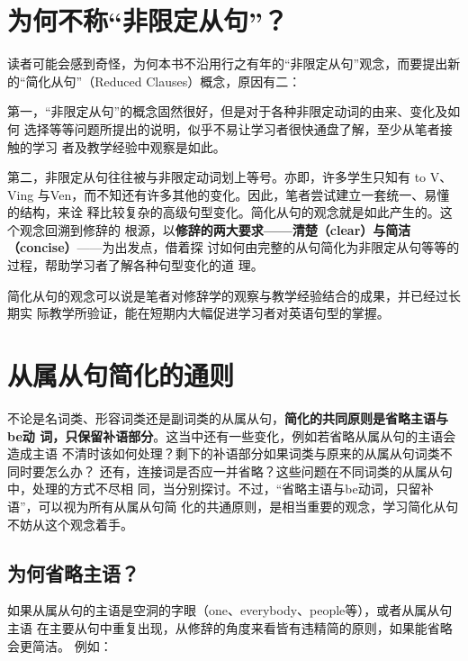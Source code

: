 \section{为何不称“非限定从句”？}

读者可能会感到奇怪，为何本书不沿用行之有年的“非限定从句”观念，而要提出新
的“简化从句”（Reduced Clauses）概念，原因有二：

第一，“非限定从句”的概念固然很好，但是对于各种非限定动词的由来、变化及如何
选择等等问题所提出的说明，似乎不易让学习者很快通盘了解，至少从笔者接触的学习
者及教学经验中观察是如此。

第二，非限定从句往往被与非限定动词划上等号。亦即，许多学生只知有 to V、Ving
与Ven，而不知还有许多其他的变化。因此，笔者尝试建立一套统一、易懂的结构，来诠
释比较复杂的高级句型变化。简化从句的观念就是如此产生的。这个观念回溯到修辞的
根源，以\textbf{修辞的两大要求——清楚（clear）与简洁（concise）}——为出发点，借着探
讨如何由完整的从句简化为非限定从句等等的过程，帮助学习者了解各种句型变化的道
理。

简化从句的观念可以说是笔者对修辞学的观察与教学经验结合的成果，并已经过长期实
际教学所验证，能在短期内大幅促进学习者对英语句型的掌握。

\section{从属从句简化的通则}

不论是名词类、形容词类还是副词类的从属从句，\textbf{简化的共同原则是省略主语与be动
  词，只保留补语部分}。这当中还有一些变化，例如若省略从属从句的主语会造成主语
不清时该如何处理？剩下的补语部分如果词类与原来的从属从句词类不同时要怎么办？
还有，连接词是否应一并省略？这些问题在不同词类的从属从句中，处理的方式不尽相
同，当分别探讨。不过，“省略主语与be动词，只留补语”，可以视为所有从属从句简
化的共通原则，是相当重要的观念，学习简化从句不妨从这个观念着手。

\subsection{为何省略主语？}

如果从属从句的主语是空洞的字眼（one、everybody、people等），或者从属从句主语
在主要从句中重复出现，从修辞的角度来看皆有违精简的原则，如果能省略会更简洁。
例如：

